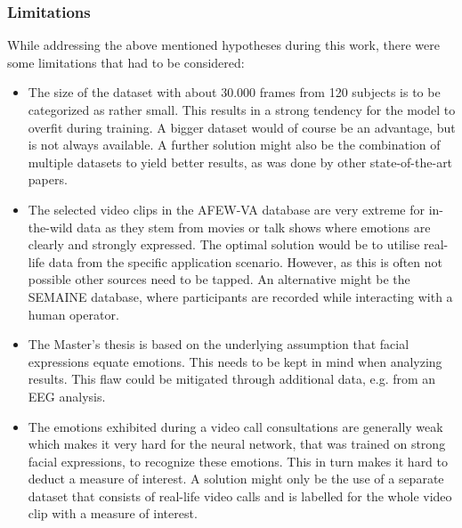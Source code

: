 \subsubsection{Limitations}
While addressing the above mentioned hypotheses during this work, there were some limitations that had to be considered:

\begin{itemize}
    \item The size of the dataset with about 30.000 frames from 120 subjects is to be categorized as rather small. This results in a strong tendency for the model to overfit during training. A bigger dataset would of course be an advantage, but is not always available. A further solution might also be the combination of multiple datasets to yield better results, as was done by other state-of-the-art papers.
    \item The selected video clips in the AFEW-VA database are very extreme for in-the-wild data as they stem from movies or talk shows where emotions are clearly and strongly expressed. The optimal solution would be to utilise real-life data from the specific application scenario. However, as this is often not possible other sources need to be tapped. An alternative might be the SEMAINE database, where participants are recorded while interacting with a human operator.
    \item The Master's thesis is based on the underlying assumption that facial expressions equate emotions. This needs to be kept in mind when analyzing results. This flaw could be mitigated through additional data, e.g. from an EEG analysis.
    \item The emotions exhibited during a video call consultations are generally weak which makes it very hard for the neural network, that was trained on strong facial expressions, to recognize these emotions. This in turn makes it hard to deduct a measure of interest. A solution might only be the use of a separate dataset that consists of real-life video calls and is labelled for the whole video clip with a measure of interest.
\end{itemize}

